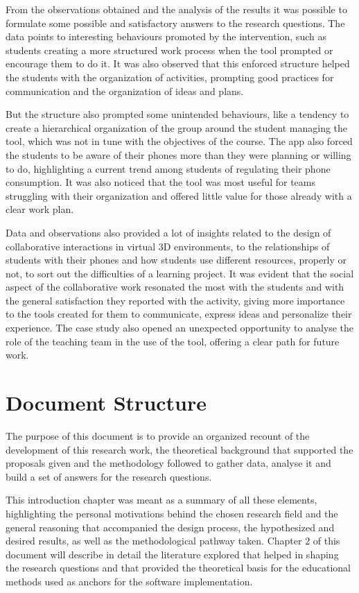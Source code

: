 From the observations obtained and the analysis of the results it was possible to formulate some possible and satisfactory answers to the research questions. The data points to interesting
behaviours promoted by the intervention, such as students creating a more structured work process when the tool prompted or encourage them to do it. It was also observed that this enforced
structure helped the students with the organization of activities, prompting good practices for communication and the organization of ideas and plans.

But the structure also prompted some unintended behaviours, like a tendency to create a hierarchical organization of the group around the student managing the tool, which was not in tune
with the objectives of the course. The app also forced the students to be aware of their phones more than they were planning or willing to do, highlighting a current trend among students
of regulating their phone consumption. It was also noticed that the tool was most useful for teams struggling with their organization and offered little value for those already with a
clear work plan.

Data and observations also provided a lot of insights related to the design of collaborative interactions in virtual 3D environments, to the relationships of students with their phones and
how students use different resources, properly or not, to sort out the difficulties of a learning project. It was evident that the social aspect of the collaborative work resonated the most
with the students and with the general satisfaction they reported with the activity, giving more importance to the tools created for them to communicate, express ideas and personalize their
experience. The case study also opened an unexpected opportunity to analyse the role of the teaching team in the use of the tool, offering a clear path for future work.

\section{Document Structure \label{sec:1-4}}

The purpose of this document is to provide an organized recount of the development of this research work, the theoretical background that supported the proposals given and the methodology
followed to gather data, analyse it and build a set of answers for the research questions.

This introduction chapter was meant as a summary of all these elements, highlighting the personal motivations behind the chosen research field and the general reasoning that accompanied
the design process, the hypothesized and desired results, as well as the methodological pathway taken. Chapter 2 of this document will describe in detail the literature explored that
helped in shaping the research questions and that provided the theoretical basis for the educational methods used as anchors for the software implementation.


